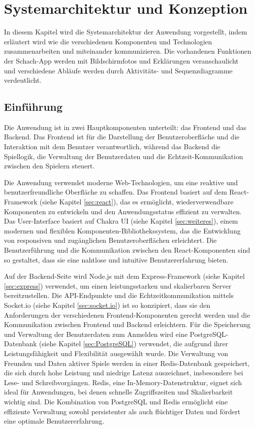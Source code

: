        
\chapter{Systemarchitektur und Konzeption}
In diesem Kapitel wird die Systemarchitektur der Anwendung vorgestellt, indem erläutert wird wie die verschiedenen Komponenten und Technologien zusammenarbeiten und miteinander kommunizieren. Die vorhandenen Funktionen der Schach-App werden mit Bildschirmfotos und Erklärungen veranschaulicht und verschiedene Abläufe werden durch Aktivitäts- und Sequenzdiagramme verdeutlicht.
\section{Einführung}
Die Anwendung ist in zwei Hauptkomponenten unterteilt: das Frontend und das Backend. Das Frontend ist für die Darstellung der Benutzeroberfläche und die Interaktion mit dem Benutzer verantwortlich, während das Backend die Spiellogik, die Verwaltung der Benutzerdaten und die Echtzeit-Kommunikation zwischen den Spielern steuert.

Die Anwendung verwendet moderne Web-Technologien, um eine reaktive und benutzerfreundliche Oberfläche zu schaffen. Das Frontend basiert auf dem React-Framework (siehe Kapitel \ref{sec:react}), das es ermöglicht, wiederverwendbare Komponenten zu entwickeln und den Anwendungsstatus effizient zu verwalten. Das User-Interface basiert auf Chakra UI (siehe Kapitel \ref{sec:weiteres}), einem modernen und flexiblen Komponenten-Bibliothekssystem, das die Entwicklung von responsiven und zugänglichen Benutzeroberflächen erleichtert. Die Benutzerführung und die Kommunikation zwischen den React-Komponenten sind so gestaltet, dass sie eine nahtlose und intuitive Benutzererfahrung bieten.

Auf der Backend-Seite wird Node.js mit dem Express-Framework (siehe Kapitel \ref{sec:express}) verwendet, um einen leistungsstarken und skalierbaren Server bereitzustellen. Die API-Endpunkte und die Echtzeitkommunikation mittels Socket.io (siehe Kapitel \ref{sec:socket.io}) ist so konzipiert, dass sie den Anforderungen der verschiedenen Frontend-Komponenten gerecht werden und die Kommunikation zwischen Frontend und Backend erleichtern. Für die Speicherung und Verwaltung der Benutzerdaten zum Anmelden wird eine PostgreSQL-Datenbank  (siehe Kapitel \ref{sec:PostgreSQL}) verwendet, die aufgrund ihrer Leistungsfähigkeit und Flexibilität ausgewählt wurde. Die Verwaltung von Freunden und Daten aktiver Spiele werden in einer Redis-Datenbank gespeichert, die sich durch hohe Leistung und niedrige Latenz auszeichnet, insbesondere bei Lese- und Schreibvorgängen. Redis, eine In-Memory-Datenstruktur, eignet sich ideal für Anwendungen, bei denen schnelle Zugriffszeiten und Skalierbarkeit wichtig sind. Die Kombination von PostgreSQL und Redis ermöglicht eine effiziente Verwaltung sowohl persistenter als auch flüchtiger Daten und fördert eine optimale Benutzererfahrung.
